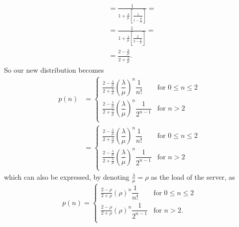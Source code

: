 \documentclass[12pt,a4paper]{article}
\begin{document}
\begin{enumerate}
\begin{align*}
			&=\frac{1}{1+\frac{\lambda}{\mu}\left[\frac{1}{1-\frac{\frac{\lambda}{\mu}}{2}}\right]}=\\
			&=\frac{1}{1+\frac{\lambda}{\mu}\left[\frac{2}{2-\frac{\lambda}{\mu}}\right]}=\\
			&=\frac{2-\frac{\lambda}{\mu}}{2+\frac{\lambda}{\mu}}.
		\end{align*}
		So our new distribution becomes
		\begin{align*}
			p(n)&=\begin{cases}
				\frac{2-\frac{\lambda}{\mu}}{2+\frac{\lambda}{\mu}}\left(\dfrac{\lambda}{\mu}\right)^{n}\dfrac{1}{n!}&\text{for }0\leqslant n\leqslant 2\\
				\frac{2-\frac{\lambda}{\mu}}{2+\frac{\lambda}{\mu}}\left(\dfrac{\lambda}{\mu}\right)^{n}\dfrac{1}{2^{n-1}}&\text{for }n> 2\\
			\end{cases}\\
			&=\begin{cases}
				\frac{2-\frac{\lambda}{\mu}}{2+\frac{\lambda}{\mu}}\left(\dfrac{\lambda}{\mu}\right)^{n}\dfrac{1}{n!}&\text{for }0\leqslant n\leqslant 2\\
				\frac{2-\frac{\lambda}{\mu}}{2+\frac{\lambda}{\mu}}\left(\dfrac{\lambda}{\mu}\right)^{n}\dfrac{1}{2^{n-1}}&\text{for }n> 2\\
			\end{cases}
		\end{align*}
		which can also be expressed, by denoting $\frac{\lambda}{\mu}=\rho$ as the load of the server, as
		\begin{equation*}
			p(n)=\begin{cases}
				\frac{2-\rho}{2+\rho}\left(\rho\right)^{n}\dfrac{1}{n!}&\text{for }0\leqslant n\leqslant 2\\
				\frac{2-\rho}{2+\rho}\left(\rho\right)^{n}\dfrac{1}{2^{n-1}}&\text{for }n> 2.\\
			\end{cases}
		\end{equation*}
	\end{enumerate}
\end{document}
